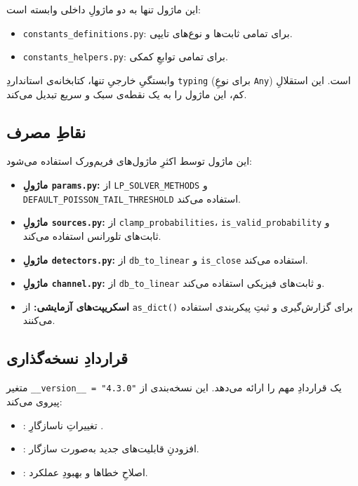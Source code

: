 این ماژول تنها به دو ماژولِ داخلی وابسته است:

\begin{itemize}
	\item \texttt{constants\_definitions.py}: برای تمامی ثابت‌ها و نوع‌های تایپی.
	\item \texttt{constants\_helpers.py}: برای تمامی توابعِ کمکی.
\end{itemize}

وابستگیِ خارجیِ تنها، کتابخانه‌ی استانداردِ \texttt{typing} (برای نوعِ \texttt{Any}) است. این استقلالِ کم، این ماژول را به یک نقطه‌ی سبک و سریع تبدیل می‌کند.

\subsection{نقاطِ مصرف}

این ماژول توسط اکثرِ ماژول‌های فریم‌ورک استفاده می‌شود:

\begin{itemize}
	\item \textbf{ماژولِ \texttt{params.py}:} از \texttt{LP\_SOLVER\_METHODS} و \texttt{DEFAULT\_POISSON\_TAIL\_THRESHOLD} استفاده می‌کند.
	\item \textbf{ماژولِ \texttt{sources.py}:} از \texttt{clamp\_probabilities}، \texttt{is\_valid\_probability} و ثابت‌های تلورانس استفاده می‌کند.
	\item \textbf{ماژولِ \texttt{detectors.py}:} از \texttt{db\_to\_linear} و \texttt{is\_close} استفاده می‌کند.
	\item \textbf{ماژولِ \texttt{channel.py}:} از \texttt{db\_to\_linear} و ثابت‌های فیزیکی استفاده می‌کند.
	\item \textbf{اسکریپت‌های آزمایشی:} از \texttt{as\_dict()} برای گزارش‌گیری و ثبتِ پیکربندی استفاده می‌کنند.
\end{itemize}

\subsection{قراردادِ نسخه‌گذاری}

متغیر \texttt{\_\_version\_\_ = "4.3.0"} یک قراردادِ مهم را ارائه می‌دهد. این نسخه‌بندی از  پیروی می‌کند:
\begin{itemize}
	\item {}: تغییراتِ ناسازگارِ .
	\item {}: افزودنِ قابلیت‌های جدید به‌صورت سازگار.
	\item {}: اصلاحِ خطاها و بهبودِ عملکرد.
\end{itemize}

